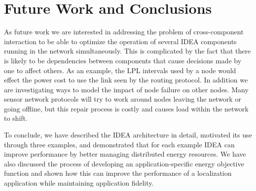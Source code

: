 \section{Future Work and Conclusions}
\label{sec-futurework}

As future work we are interested in addressing the problem of cross-component
interaction to be able to optimize the operation of several IDEA components
running in the network simultaneously. This is complicated by the fact that
there is likely to be dependencies between components that cause decisions
made by one to affect others. As an example, the LPL intervals used by a node
would effect the power cost to use the link seen by the routing protocol.  In
addition we are investigating ways to model the impact of node failure on
other nodes. Many sensor network protocols will try to work around nodes
leaving the network or going offline, but this repair process is costly and
causes load within the network to shift.

To conclude, we have described the IDEA architecture in detail, motivated its
use through three examples, and demonstrated that for each example IDEA can
improve performance by better managing distributed energy resources. We have
also discussed the process of developing an application-specific energy
objective function and shown how this can improve the performance of a
localization application while maintaining application fidelity.
\vfill\eject
